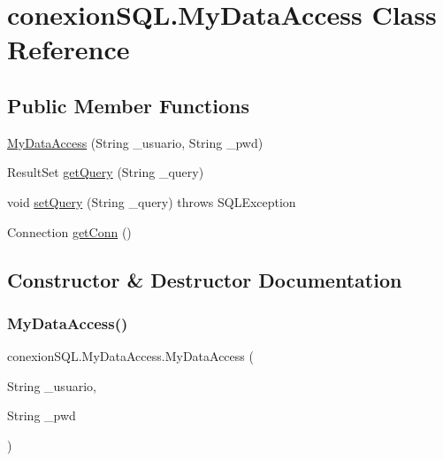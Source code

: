 \hypertarget{classconexion_s_q_l_1_1_my_data_access}{}\section{conexion\+S\+Q\+L.\+My\+Data\+Access Class Reference}
\label{classconexion_s_q_l_1_1_my_data_access}
\subsection*{Public Member Functions}
\begin{DoxyCompactItemize}
\item 
\mbox{\hyperlink{classconexion_s_q_l_1_1_my_data_access_a6c94dfb5301a4653cd0b084149e2d426}{My\+Data\+Access}} (String \+\_\+usuario, String \+\_\+pwd)
\item 
Result\+Set \mbox{\hyperlink{classconexion_s_q_l_1_1_my_data_access_ae8d04039a000d2b3e7dc72c99be7c551}{get\+Query}} (String \+\_\+query)
\item 
void \mbox{\hyperlink{classconexion_s_q_l_1_1_my_data_access_a9c57d53829ea15bb0bc59d7647cc6249}{set\+Query}} (String \+\_\+query)  throws S\+Q\+L\+Exception
\item 
Connection \mbox{\hyperlink{classconexion_s_q_l_1_1_my_data_access_a3317cee8cca3bea96e915daf445e068d}{get\+Conn}} ()
\end{DoxyCompactItemize}


\subsection{Constructor \& Destructor Documentation}
\mbox{\label{classconexion_s_q_l_1_1_my_data_access_a6c94dfb5301a4653cd0b084149e2d426}} 
\subsubsection{\texorpdfstring{My\+Data\+Access()}{MyDataAccess()}}
{\footnotesize\ttfamily conexion\+S\+Q\+L.\+My\+Data\+Access.\+My\+Data\+Access (\begin{DoxyParamCaption}\item[{String}]{\+\_\+usuario,  }\item[{String}]{\+\_\+pwd }\end{DoxyParamCaption})}

